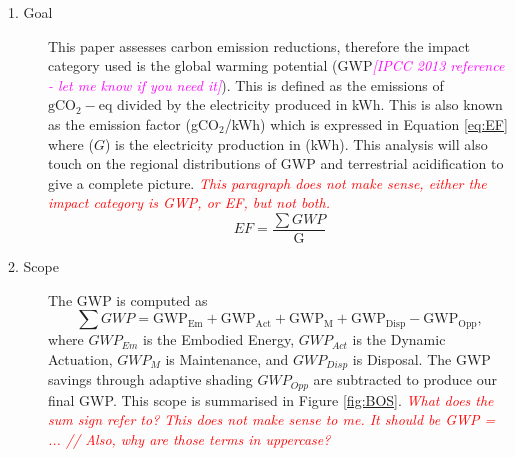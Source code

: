 \begin{description}
\item[1. Goal] This paper assesses carbon emission reductions, therefore the impact category used is the global warming potential (GWP\textcolor{magenta}{\textit{[IPCC 2013 reference - let me know if you need it]}}). This is defined as the emissions of ${\mathrm{gCO_2-eq}}$ divided by the electricity produced in kWh. This is also known as the emission factor (gCO$_2$/kWh) which is expressed in Equation \ref{eq:EF} where ($G$) is the electricity production in (kWh). This analysis will also touch on the regional distributions of GWP and terrestrial acidification to give a complete picture.
\textcolor{red}{\textit{This paragraph does not make sense, either the impact category is GWP, or EF, but not both.}}
\begin{equation}
EF=\frac{{\sum GWP}}{\mathrm{G}}
\label{eq:EF}
\end{equation}

\item[2. Scope] The GWP is computed as
\begin{equation}
\sum GWP={\mathrm{GWP_{Em}  + GWP_{Act} + GWP_{M} + GWP_{Disp} - GWP_{Opp} }},
\label{eq:GWP}
\end{equation}
where $GWP_{Em}$ is the Embodied Energy, $GWP_{Act}$ is the Dynamic Actuation, $GWP_{M}$ is Maintenance, and $GWP_{Disp}$ is Disposal. The GWP savings through adaptive shading $GWP_{Opp}$ are subtracted to produce our final GWP. This scope is summarised in Figure \ref{fig:BOS}.
\textcolor{red}{\textit{What does the sum sign refer to? This does not make sense to me. It should be GWP = ... // Also, why are those terms in uppercase?}}









\end{description}

